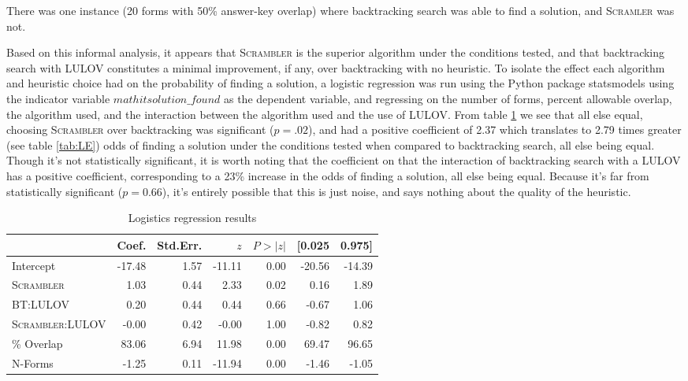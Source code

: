 \documentclass[11pt]{article}
\begin{document}
There was one instance (20 forms with 50\% answer-key overlap) where
backtracking search was able to find a solution, and \textsc{Scramler}
was not.
\par
Based on this informal analysis, it appears that \textsc{Scrambler} is
the superior algorithm under the conditions tested, and that
backtracking search with LULOV constitutes a minimal improvement, if
any, over backtracking with no heuristic. To isolate the effect each
algorithm and heuristic choice had on the probability of finding a
solution, a logistic regression was run using the Python \cite{python}
package statsmodels \cite{seabold2010statsmodels} using the indicator
variable \(mathit{solution\_found}\)
as the dependent variable, and regressing on the number of forms,
percent allowable overlap, the algorithm used, and the interaction
between the algorithm used and the use of LULOV.  From table
\ref{tab:LR} we see that all else equal, choosing \textsc{Scrambler}
over backtracking was significant (\(p=.02\)),
and had a positive coefficient of 2.37 which translates to 2.79 times
greater (see table \ref{tab:LE}) odds of finding a solution under the
conditions tested when compared to backtracking search, all else being
equal. Though it's not statistically significant, it is worth noting
that the coefficient on that the interaction of backtracking search
with a LULOV has a positive coefficient, corresponding to a 23\%
increase in the odds of finding a solution, all else being equal.
Because it's far from statistically significant (\(p=0.66\)),
it's entirely possible that this is just noise, and says nothing about
the quality of the heuristic.
\par

\begin{table}
  \centering
  \begin{tabular}{lrrrrrr}
    \toprule[1.5pt]
    {} &  Coef. &  Std.Err. &      $z$ &  $P>|z|$ &  [0.025 &  0.975] \\
    \midrule
    Intercept                          & -17.48 &      1.57 & -11.11 &   0.00 &  -20.56 &  -14.39 \\
    \textsc{Scrambler}                 &   1.03 &      0.44 &   2.33 &   0.02 &    0.16 &    1.89 \\
    BT:LULOV       &   0.20 &      0.44 &   0.44 &   0.66 &   -0.67 &    1.06 \\
    \textsc{Scrambler}:LULOV &  -0.00 &      0.42 &  -0.00 &   1.00 &   -0.82 &    0.82 \\
    \% Overlap                    &  83.06 &      6.94 &  11.98 &   0.00 &   69.47 &   96.65 \\
    N-Forms                             &  -1.25 &      0.11 & -11.94 &   0.00 &   -1.46 &   -1.05 \\
    \bottomrule[1.2pt]
    
  \end{tabular}
  \caption{Logistics regression results}\label{tab:LR}
\end{table}
\end{document}

